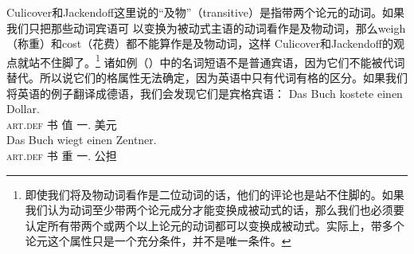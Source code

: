 Culicover和Jackendoff这里说的“及物”（transitive）是指带两个论元的动词。如果我们只把那些动词宾语可
以变换为被动式主语的动词看作是及物动词，那么weigh（称重）和cost（花费）都不能算作是及物动词，这样
Culicover和Jackendoff的观点就站不住脚了。\footnote{%
即使我们将及物动词看作是二位动词的话，他们的评论也是站不住脚的。如果我们认为动词至少带两个论元成分才能变换成被动式的话，那么我们也必须要认定所有带两个或两个以上论元的动词都可以变换成被动式。实际上，带多个论元这个属性只是一个充分条件，并不是唯一条件。}
诸如例（）中的名词短语不是普通宾语，因为它们不能被代词替代。所以说它们的格属性无法确定，因为英语中只有代词有格的区分。如果我们将英语的例子翻译成德语，我们会发现它们是宾格宾语：
\eal
\ex 
\gll Das Buch kostete einen Dollar.\\
       \textsc{art}.\textsc{def} 书 值 一.\acc{} 美元\\
\ex 
\gll Das Buch wiegt einen Zentner.\\
     \textsc{art}.\textsc{def} 书 重 一.\acc{} 公担\\
\zl


